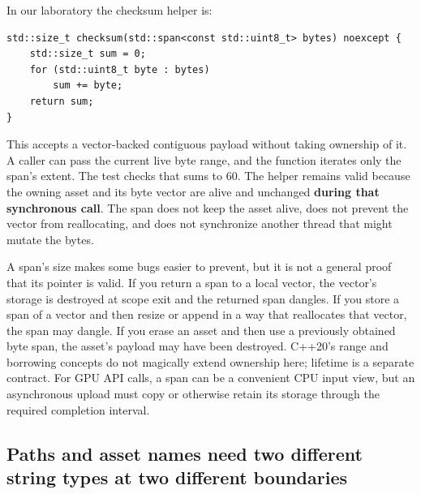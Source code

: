 In our laboratory the checksum helper is:

\begin{verbatim}
std::size_t checksum(std::span<const std::uint8_t> bytes) noexcept {
    std::size_t sum = 0;
    for (std::uint8_t byte : bytes)
        sum += byte;
    return sum;
}
\end{verbatim}

This accepts a vector-backed contiguous payload without taking ownership of it. A caller can pass the current live byte range, and the function iterates only the span's extent. The test checks that  sums to 60. The helper remains valid because the owning asset and its byte vector are alive and unchanged \textbf{during that synchronous call}. The span does not keep the asset alive, does not prevent the vector from reallocating, and does not synchronize another thread that might mutate the bytes.

A span's size makes some bugs easier to prevent, but it is not a general proof that its pointer is valid. If you return a span to a local vector, the vector's storage is destroyed at scope exit and the returned span dangles. If you store a span of a vector and then resize or append in a way that reallocates that vector, the span may dangle. If you erase an asset and then use a previously obtained byte span, the asset's payload may have been destroyed. C++20's range and borrowing concepts do not magically extend ownership here; lifetime is a separate contract. For GPU API calls, a span can be a convenient CPU input view, but an asynchronous upload must copy or otherwise retain its storage through the required completion interval.

\subsection{Paths and asset names need two different string types at two different boundaries}\label{01-foundations-i-ch006-paths-and-asset-names-need-two-different-string-types-at-two-different-boundaries}

\hypertarget{01-foundations-i-ch006-paths-and-asset-names-need-two-different-string-types-at-two-different-boundaries}{}

